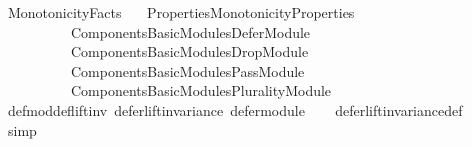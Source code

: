 %
\begin{isabellebody}%
%
%
\isadelimtheory
%
\endisadelimtheory
%
\isatagtheory
{}\isamarkupfalse%
\ Monotonicity{\isacharunderscore}{\kern0pt}Facts\isanewline
\ \ \ {\isachardoublequoteopen}{\isachardot}{\kern0pt}{\isachardot}{\kern0pt}{\isacharslash}{\kern0pt}Properties{\isacharslash}{\kern0pt}Monotonicity{\isacharunderscore}{\kern0pt}Properties{\isachardoublequoteclose}\isanewline
\ \ \ \ \ \ \ \ \ \ {\isachardoublequoteopen}{\isachardot}{\kern0pt}{\isachardot}{\kern0pt}{\isacharslash}{\kern0pt}Components{\isacharslash}{\kern0pt}Basic{\isacharunderscore}{\kern0pt}Modules{\isacharslash}{\kern0pt}Defer{\isacharunderscore}{\kern0pt}Module{\isachardoublequoteclose}\isanewline
\ \ \ \ \ \ \ \ \ \ {\isachardoublequoteopen}{\isachardot}{\kern0pt}{\isachardot}{\kern0pt}{\isacharslash}{\kern0pt}Components{\isacharslash}{\kern0pt}Basic{\isacharunderscore}{\kern0pt}Modules{\isacharslash}{\kern0pt}Drop{\isacharunderscore}{\kern0pt}Module{\isachardoublequoteclose}\isanewline
\ \ \ \ \ \ \ \ \ \ {\isachardoublequoteopen}{\isachardot}{\kern0pt}{\isachardot}{\kern0pt}{\isacharslash}{\kern0pt}Components{\isacharslash}{\kern0pt}Basic{\isacharunderscore}{\kern0pt}Modules{\isacharslash}{\kern0pt}Pass{\isacharunderscore}{\kern0pt}Module{\isachardoublequoteclose}\isanewline
\ \ \ \ \ \ \ \ \ \ {\isachardoublequoteopen}{\isachardot}{\kern0pt}{\isachardot}{\kern0pt}{\isacharslash}{\kern0pt}Components{\isacharslash}{\kern0pt}Basic{\isacharunderscore}{\kern0pt}Modules{\isacharslash}{\kern0pt}Plurality{\isacharunderscore}{\kern0pt}Module{\isachardoublequoteclose}\isanewline
\isanewline
{}%
\endisatagtheory
{\isafoldtheory}%
%
\isadelimtheory
\isanewline
%
\endisadelimtheory
\isanewline
{}\isamarkupfalse%
\ def{\isacharunderscore}{\kern0pt}mod{\isacharunderscore}{\kern0pt}def{\isacharunderscore}{\kern0pt}lift{\isacharunderscore}{\kern0pt}inv{\isacharcolon}{\kern0pt}\ {\isachardoublequoteopen}defer{\isacharunderscore}{\kern0pt}lift{\isacharunderscore}{\kern0pt}invariance\ defer{\isacharunderscore}{\kern0pt}module{\isachardoublequoteclose}\isanewline
%
\isadelimproof
\ \ %
\endisadelimproof
%
\isatagproof
{}\isamarkupfalse%
\ defer{\isacharunderscore}{\kern0pt}lift{\isacharunderscore}{\kern0pt}invariance{\isacharunderscore}{\kern0pt}def\isanewline
\ \ \isamarkupfalse%
\ simp%
\endisatagproof
{\isafoldproof}%
%
\isadelimproof
\isanewline
%
\endisadelimproof
\isanewline
\isanewline

\end{isabellebody}
